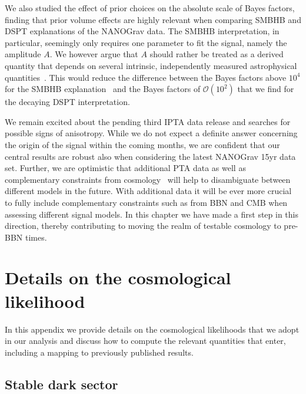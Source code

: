 We also studied the effect of prior choices on the absolute scale of Bayes factors, finding that prior volume effects are highly relevant when comparing \ac{SMBHB} and \ac{DSPT} explanations of the \ac{NANOGrav} data. The \ac{SMBHB} interpretation, in particular, seemingly only requires  one parameter to fit the signal, namely the amplitude $A$. We however argue that $A$ should rather be treated as a derived quantity that depends on several intrinsic, independently measured astrophysical quantities~\cite{Casey-Clyde:2021xro}. This would reduce the difference between the Bayes factors above $10^4$ for the \ac{SMBHB} explanation~\cite{NANOGrav:2020bcs} and the Bayes factors of $\mathcal{O}(10^2)$ that we find for the decaying \ac{DSPT} interpretation.

We remain excited about the pending third \ac{IPTA} data  release and searches for possible signs of anisotropy. While we do not expect a definite answer concerning the origin of the signal within the coming months, we are confident that our central results  are robust also when considering the latest \ac{NANOGrav} 15yr data set. Further, we are optimistic that additional \ac{PTA} data as well as complementary constraints from cosmology~\cite{Ramberg:2022irf} will help to disambiguate between different models in the future. With additional data it will be ever more crucial to fully include complementary constraints such as from \ac{BBN} and \ac{CMB} when assessing different signal models. In this chapter we have made a first step in this direction, thereby contributing to moving the realm of testable cosmology to pre-\ac{BBN} times.

\newpage

\appendix
	
	\section{Details on the cosmological likelihood}
	\label{app:details_cosmo}
	
	In this appendix we provide details on the cosmological likelihoods that we adopt in our analysis and discuss how to compute the relevant quantities that enter, including a mapping to previously published results.
	
	\subsection{Stable dark sector}
	\label{app:cosmo_stable_ds}
	
